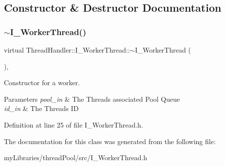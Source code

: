 \subsection{Constructor \& Destructor Documentation}
\mbox{\label{classThreadHandler_1_1I__WorkerThread_ac2968cf7e384a733d80416ef1df37a43}} 
\subsubsection{\texorpdfstring{$\sim$I\_WorkerThread()}{~I\_WorkerThread()}}
{\footnotesize\ttfamily virtual Thread\+Handler\+::\+I\+\_\+\+Worker\+Thread\+::$\sim$\+I\+\_\+\+Worker\+Thread (\begin{DoxyParamCaption}{ }\end{DoxyParamCaption})\hspace{0.3cm}{\ttfamily [inline]}, {\ttfamily [virtual]}}



Constructor for a worker. 


\begin{DoxyParams}{Parameters}
{\em pool\+\_\+in} & The Threads associated Pool Queue \\
\hline
{\em id\+\_\+in} & The Threads ID \\
\hline
\end{DoxyParams}


Definition at line 25 of file I\+\_\+\+Worker\+Thread.\+h.



The documentation for this class was generated from the following file\+:\begin{DoxyCompactItemize}
\item 
my\+Libraries/thread\+Pool/src/I\+\_\+\+Worker\+Thread.\+h\end{DoxyCompactItemize}
